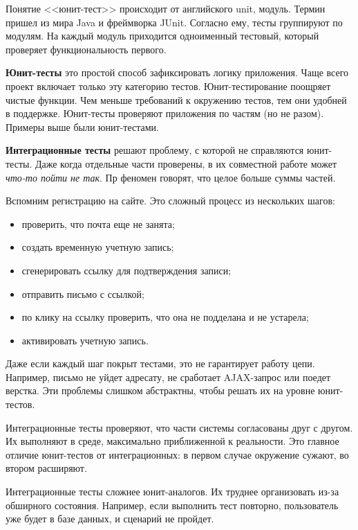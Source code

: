 Понятие <<юнит-тест>> происходит от английского unit, модуль. Термин пришел из
мира Java и фреймворка JUnit. Согласно ему, тесты группируют по модулям. На
каждый модуль приходится одноименный тестовый, который проверяет
функциональность первого.

\textbf{Юнит-тесты} это простой способ зафиксировать логику приложения. Чаще
всего проект включает только эту категорию тестов. Юнит-тестирование поощряет
чистые функции. Чем меньше требований к окружению тестов, тем они удобней в
поддержке. Юнит-тесты проверяют приложения по частям (но не разом). Примеры выше
были юнит-тестами.

\textbf{Интеграционные тесты} решают проблему, с которой не справляются
юнит-тесты. Даже когда отдельные части проверены, в их совместной работе может
\emph{что-то пойти не так}. Пр феномен говорят, что целое больше суммы частей.

Вспомним регистрацию на сайте. Это сложный процесс из нескольких шагов:

\begin{itemize}

\item
  проверить, что почта еще не занята;

\item
  создать временную учетную запись;

\item
  сгенерировать ссылку для подтверждения записи;

\item
  отправить письмо с ссылкой;

\item
  по клику на ссылку проверить, что она не подделана и не устарела;

\item
  активировать учетную запись.

\end{itemize}

Даже если каждый шаг покрыт тестами, это не гарантирует работу цепи. Например,
письмо не уйдет адресату, не сработает AJAX-запрос или поедет верстка. Эти
проблемы слишком абстрактны, чтобы решать их на уровне юнит-тестов.

Интеграционные тесты проверяют, что части системы согласованы друг с другом. Их
выполняют в среде, максимально приближенной к реальности. Это главное отличие
юнит-тестов от интеграционных: в первом случае окружение сужают, во втором
расширяют.

Интеграционные тесты сложнее юнит-аналогов. Их труднее организовать из-за
обширного состояния. Например, если выполнить тест повторно, пользователь уже
будет в базе данных, и сценарий не пройдет.

